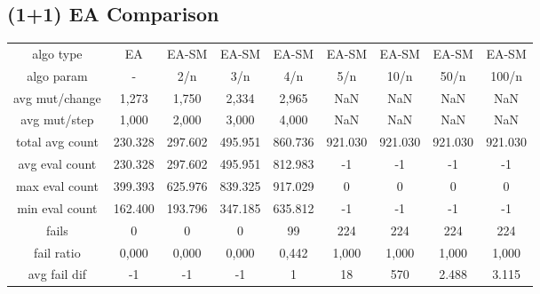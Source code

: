 \subsection{(1+1) EA Comparison}
\begin{tabular}[h]{ccccccccc}
algo type&             EA&   EA-SM&   EA-SM&   EA-SM&   EA-SM&   EA-SM&   EA-SM&   EA-SM\\
algo param&             -&     2/n&     3/n&     4/n&     5/n&    10/n&    50/n&   100/n\\
avg mut/change&     1,273&   1,750&   2,334&   2,965&     NaN&     NaN&     NaN&     NaN\\
avg mut/step&       1,000&   2,000&   3,000&   4,000&     NaN&     NaN&     NaN&     NaN\\
\hline
total avg count&  230.328& 297.602& 495.951& 860.736& 921.030& 921.030& 921.030& 921.030\\
avg eval count&   230.328& 297.602& 495.951& 812.983&      -1&      -1&      -1&      -1\\
max eval count&   399.393& 625.976& 839.325& 917.029&       0&       0&       0&       0\\
min eval count&   162.400& 193.796& 347.185& 635.812&      -1&      -1&      -1&      -1\\
\hline
fails&                  0&       0&       0&      99&     224&     224&     224&     224\\
fail ratio&         0,000&   0,000&   0,000&   0,442&   1,000&   1,000&   1,000&   1,000\\
avg fail dif&          -1&      -1&      -1&       1&      18&     570&   2.488&   3.115\\
\end{tabular}
